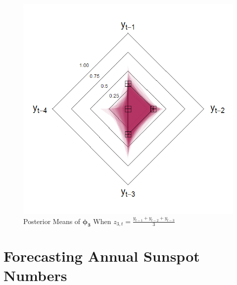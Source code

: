 \begin{figure}[!h]
\begin{minipage}[h]{0.4\textwidth}
\end{minipage}
\begin{minipage}[h]{0.8\textwidth}
\caption{Posterior Means of $\bm{\phi_3}$ When $z_{3,t}=\frac{y_{t-1}+y_{t-2}+y_{t-3}}{3}$}
\label{fig:th3}
\center
\includegraphics[scale=0.32]{hsthvar3}
\end{minipage}
\end{figure}




\section{Forecasting Annual Sunspot Numbers}

